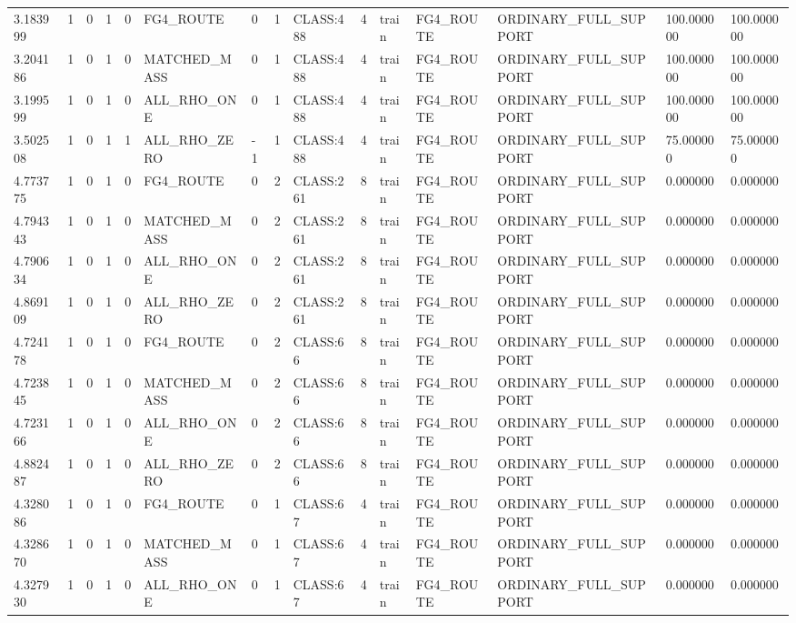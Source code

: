 \begin{tabular}{lllllllllllllll}
3.183999 & 1 & 0 & 1 & 0 & FG4\_ROUTE & 0 & 1 & CLASS:488 & 4 & train & FG4\_ROUTE & ORDINARY\_FULL\_SUPPORT & 100.000000 & 100.000000 \\
3.204186 & 1 & 0 & 1 & 0 & MATCHED\_MASS & 0 & 1 & CLASS:488 & 4 & train & FG4\_ROUTE & ORDINARY\_FULL\_SUPPORT & 100.000000 & 100.000000 \\
3.199599 & 1 & 0 & 1 & 0 & ALL\_RHO\_ONE & 0 & 1 & CLASS:488 & 4 & train & FG4\_ROUTE & ORDINARY\_FULL\_SUPPORT & 100.000000 & 100.000000 \\
3.502508 & 1 & 0 & 1 & 1 & ALL\_RHO\_ZERO & -1 & 1 & CLASS:488 & 4 & train & FG4\_ROUTE & ORDINARY\_FULL\_SUPPORT & 75.000000 & 75.000000 \\
4.773775 & 1 & 0 & 1 & 0 & FG4\_ROUTE & 0 & 2 & CLASS:261 & 8 & train & FG4\_ROUTE & ORDINARY\_FULL\_SUPPORT & 0.000000 & 0.000000 \\
4.794343 & 1 & 0 & 1 & 0 & MATCHED\_MASS & 0 & 2 & CLASS:261 & 8 & train & FG4\_ROUTE & ORDINARY\_FULL\_SUPPORT & 0.000000 & 0.000000 \\
4.790634 & 1 & 0 & 1 & 0 & ALL\_RHO\_ONE & 0 & 2 & CLASS:261 & 8 & train & FG4\_ROUTE & ORDINARY\_FULL\_SUPPORT & 0.000000 & 0.000000 \\
4.869109 & 1 & 0 & 1 & 0 & ALL\_RHO\_ZERO & 0 & 2 & CLASS:261 & 8 & train & FG4\_ROUTE & ORDINARY\_FULL\_SUPPORT & 0.000000 & 0.000000 \\
4.724178 & 1 & 0 & 1 & 0 & FG4\_ROUTE & 0 & 2 & CLASS:66 & 8 & train & FG4\_ROUTE & ORDINARY\_FULL\_SUPPORT & 0.000000 & 0.000000 \\
4.723845 & 1 & 0 & 1 & 0 & MATCHED\_MASS & 0 & 2 & CLASS:66 & 8 & train & FG4\_ROUTE & ORDINARY\_FULL\_SUPPORT & 0.000000 & 0.000000 \\
4.723166 & 1 & 0 & 1 & 0 & ALL\_RHO\_ONE & 0 & 2 & CLASS:66 & 8 & train & FG4\_ROUTE & ORDINARY\_FULL\_SUPPORT & 0.000000 & 0.000000 \\
4.882487 & 1 & 0 & 1 & 0 & ALL\_RHO\_ZERO & 0 & 2 & CLASS:66 & 8 & train & FG4\_ROUTE & ORDINARY\_FULL\_SUPPORT & 0.000000 & 0.000000 \\
4.328086 & 1 & 0 & 1 & 0 & FG4\_ROUTE & 0 & 1 & CLASS:67 & 4 & train & FG4\_ROUTE & ORDINARY\_FULL\_SUPPORT & 0.000000 & 0.000000 \\
4.328670 & 1 & 0 & 1 & 0 & MATCHED\_MASS & 0 & 1 & CLASS:67 & 4 & train & FG4\_ROUTE & ORDINARY\_FULL\_SUPPORT & 0.000000 & 0.000000 \\
4.327930 & 1 & 0 & 1 & 0 & ALL\_RHO\_ONE & 0 & 1 & CLASS:67 & 4 & train & FG4\_ROUTE & ORDINARY\_FULL\_SUPPORT & 0.000000 & 0.000000 \\

\end{tabular}
